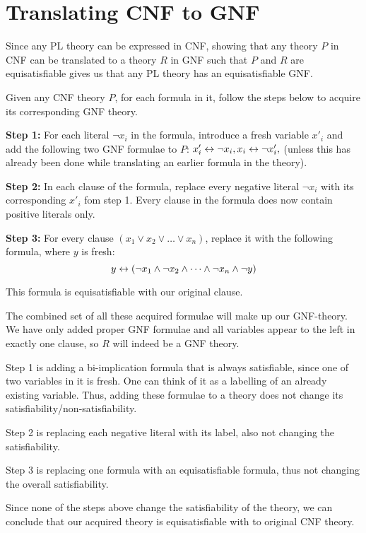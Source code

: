 \section{Translating CNF to GNF}
\label{sec:Translating CNF to GNF}
Since any PL theory can be expressed in CNF, showing that any theory $P$ in CNF can be translated to a theory $R$ in GNF such that $P$ and $R$ are equisatisfiable gives us that any PL theory has an equisatisfiable GNF.

Given any CNF theory $P$, for each formula in it, follow the steps below to acquire its corresponding GNF theory.

\textbf{Step 1:}
For each literal $\neg x_i$ in the formula, introduce a fresh variable $x'_i$ and add the following two GNF formulae to $P$:
$x'_i \leftrightarrow \neg x_i, x_i \leftrightarrow \neg x'_i,$ (unless this has already been done while translating an earlier formula in the theory).

\textbf{Step 2:}
In each clause of the formula, replace every negative literal $\neg x_i$ with its corresponding $x'_i$ fom step 1.
Every clause in the formula does now contain positive literals only.

\textbf{Step 3:}
For every clause $(x_1 \vee x_2 \vee \dots \vee x_n)$, replace it with the following formula, where $y$ is fresh:
\[y \leftrightarrow (\neg x_1 \wedge \neg x_2 \wedge \dots \wedge \neg x_n \wedge \neg y)\]

This formula is equisatisfiable with our original clause.

The combined set of all these acquired formulae will make up our GNF-theory.
We have only added proper GNF formulae and all variables appear to the left in exactly one clause, so $R$ will indeed be a GNF theory.

Step 1 is adding a bi-implication formula that is always satisfiable, since one of two variables in it is fresh.
One can think of it as a labelling of an already existing variable.
Thus, adding these formulae to a theory does not change its satisfiability/non-satisfiability.

Step 2 is replacing each negative literal with its label, also not changing the satisfiability.

Step 3 is replacing one formula with an equisatisfiable formula, thus not changing the overall satisfiability.

Since none of the steps above change the satisfiability of the theory, we can conclude that our acquired theory is equisatisfiable with to original CNF theory.

